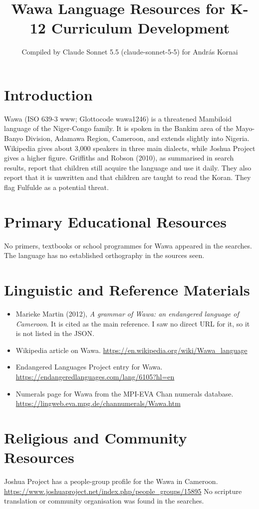 \documentclass[12pt]{article}
\title{Wawa Language Resources for K-12 Curriculum Development}
\author{Compiled by Claude Sonnet 5.5 (claude-sonnet-5-5) for Andr\'as Kornai}
\date{}
\begin{document}
\maketitle

\section{Introduction}
Wawa (ISO 639-3 www; Glottocode wawa1246) is a threatened Mambiloid language of the Niger-Congo family. It is spoken in the Bankim area of the Mayo-Banyo Division, Adamawa Region, Cameroon, and extends slightly into Nigeria. Wikipedia gives about 3,000 speakers in three main dialects, while Joshua Project gives a higher figure. Griffiths and Robson (2010), as summarised in search results, report that children still acquire the language and use it daily. They also report that it is unwritten and that children are taught to read the Koran. They flag Fulfulde as a potential threat.

\section{Primary Educational Resources}
No primers, textbooks or school programmes for Wawa appeared in the searches. The language has no established orthography in the sources seen.

\section{Linguistic and Reference Materials}
\begin{itemize}
\item Marieke Martin (2012), \emph{A grammar of Wawa: an endangered language of Cameroon}. It is cited as the main reference. I saw no direct URL for it, so it is not listed in the JSON.
\item Wikipedia article on Wawa. \url{https://en.wikipedia.org/wiki/Wawa_language}
\item Endangered Languages Project entry for Wawa. \url{https://endangeredlanguages.com/lang/6105?hl=en}
\item Numerals page for Wawa from the MPI-EVA Chan numerals database. \url{https://lingweb.eva.mpg.de/channumerals/Wawa.htm}
\end{itemize}

\section{Religious and Community Resources}
Joshua Project has a people-group profile for the Wawa in Cameroon. \url{https://www.joshuaproject.net/index.php/people_groups/15895} No scripture translation or community organisation was found in the searches.
\end{document}
